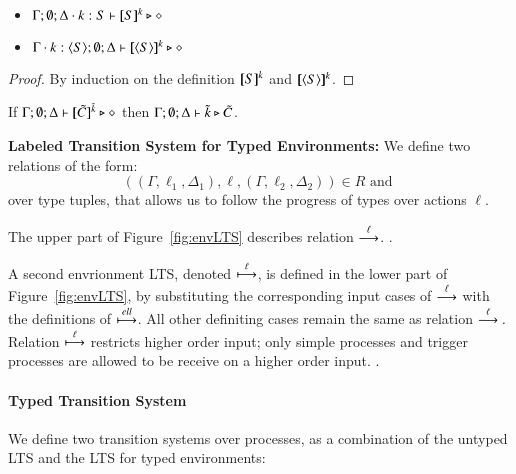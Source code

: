 \begin{proposition}\rm
$ $
	\begin{itemize}
		\item	$\Gamma; \emptyset; \Delta \cdot k:S \vdash [\!\![S]\!\!]^k \triangleright \diamond$
		\item	$\Gamma \cdot k:\langle S \rangle; \emptyset; \Delta \vdash [\!\![\langle S \rangle]\!\!]^k \triangleright \diamond$
	\end{itemize}
\end{proposition}

\begin{proof}
	By induction on the definition $[\!\![S]\!\!]^k$ and $[\!\![\langle S \rangle]\!\!]^k$.
\end{proof}

\begin{corollary}\rm
	If $\Gamma; \emptyset; \Delta \vdash [\!\![\tilde{C}]\!\!]^{\tilde{k}} \triangleright \diamond$
	then
	$\Gamma; \emptyset; \Delta \vdash \tilde{k} \triangleright \tilde{C}$.
\end{corollary}


{\bf Labeled Transition System for Typed Environments: }
We define two relations of the form:
%
\[
	((\Gamma, \ell_1, \Delta_1), \ell, (\Gamma, \ell_2, \Delta_2)) \in R \textrm{ and }
\]
%
\noi over type tuples, that allows us to follow the progress of types over actions $\ell$.



The upper part of Figure~\ref{fig:envLTS} describes relation $\stackrel{\ell}{\longrightarrow}$.
.

A second envrionment LTS, denoted $\stackrel{\ell}{\longmapsto}$, is defined in the lower part of
Figure~\ref{fig:envLTS}, by substituting the corresponding input cases
of $\stackrel{\ell}{\longrightarrow}$ with the definitions of $\stackrel{ell}{\longmapsto}$. All other definiting
cases remain the same as relation $\stackrel{\ell}{\longrightarrow}. $Relation $\stackrel{\ell}{\longmapsto}$ 
restricts higher order input; only simple processes and trigger processes
are allowed to be receive on a higher order input.
. 

\paragraph{Typed Transition System}

We define two transition systems over processes, as a combination
of the untyped LTS and the LTS for typed environments:

